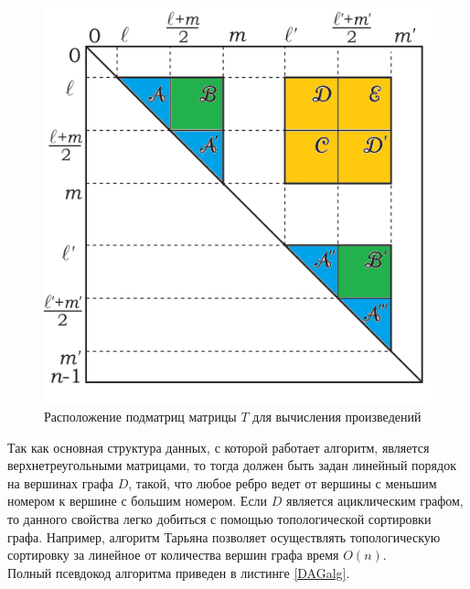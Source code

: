 \documentclass{spbau-diploma}
\begin{document}
\begin{figure}
\centering
\includegraphics{sub1.jpg}
\caption{Расположение подматриц матрицы $T$ для вычисления произведений}
\label{submatrices2}
\end{figure}
\par
Так как основная структура данных, с которой работает алгоритм,
является верхнетреугольными матрицами, то тогда должен быть
задан линейный порядок на вершинах графа $D$, такой, что любое
ребро ведет от вершины с меньшим номером к вершине с
большим номером. Если $D$ является ациклическим графом, то
данного свойства легко добиться с помощью топологической
сортировки графа. Например, алгоритм Тарьяна \cite{Tarjan} позволяет
осуществлять топологическую сортировку за линейное от
количества вершин графа время $O(n)$.
\\
Полный псевдокод алгоритма приведен в листинге \ref{DAGalg}.
\end{document}
